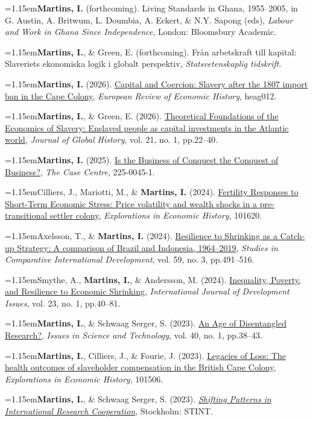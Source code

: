 \documentclass[11pt,a4paper]{article}
\newcommand{\cvlistitem}[1]{\par\addvspace{5pt}\noindent
  \textcolor{accent}{\raisebox{.45ex}{\rule{3.2pt}{3.2pt}}}\hspace{7pt}%
  \begin{minipage}[t]{\dimexpr\linewidth-12pt\relax}\hangindent=1.15em\hangafter=1\relax #1\par\end{minipage}\par}
\begin{document}
\cvlistitem{\textbf{Martins, I.} (forthcoming). Living Standards in Ghana, 1955--2005, in G. Austin, A. Britwum, L. Doumbia, A. Eckert, \& N.Y. Sapong (eds), \textit{Labour and Work in Ghana Since Independence}, London: Bloomsbury Academic.}
\smallskip
\cvlistitem{\textbf{Martins, I.}, \& Green, E. (forthcoming). Från arbetskraft till kapital: Slaveriets ekonomiska logik i globalt perspektiv, \textit{Statsvetenskaplig tidskrift}.}
\smallskip
\cvlistitem{\textbf{Martins, I.} (2026). \href{https://doi.org/10.1093/ereh/heag012}{Capital and Coercion: Slavery after the 1807 import ban in the Cape Colony}, \textit{European Review of Economic History}, heag012.}
\smallskip
\cvlistitem{\textbf{Martins, I.}, \& Green, E. (2026). \href{https://doi.org/10.1017/S1740022825100296}{Theoretical Foundations of the Economics of Slavery: Enslaved people as capital investments in the Atlantic world}, \textit{Journal of Global History}, vol. 21, no. 1, pp.22--40.}
\smallskip
\cvlistitem{\textbf{Martins, I.} (2025). \href{https://www.thecasecentre.org/products/view?id=208126}{Is the Business of Conquest the Conquest of Business?}, \textit{The Case Centre}, 225-0045-1.}
\smallskip
\cvlistitem{Cilliers, J., Mariotti, M., \& \textbf{Martins, I.} (2024). \href{https://doi.org/10.1016/j.eeh.2024.101620}{Fertility Responses to Short-Term Economic Stress: Price volatility and wealth shocks in a pre-transitional settler colony}, \textit{Explorations in Economic History}, 101620.}
\smallskip
\cvlistitem{Axelsson, T., \& \textbf{Martins, I.} (2024). \href{https://doi.org/10.1007/s12116-023-09392-1}{Resilience to Shrinking as a Catch-up Strategy: A comparison of Brazil and Indonesia, 1964--2019}, \textit{Studies in Comparative International Development}, vol. 59, no. 3, pp.491--516.}
\smallskip
\cvlistitem{Smythe, A., \textbf{Martins, I.}, \& Andersson, M. (2024). \href{https://doi.org/10.1108/IJDI-06-2023-0168}{Inequality, Poverty, and Resilience to Economic Shrinking}, \textit{International Journal of Development Issues}, vol. 23, no. 1, pp.40--81.}
\smallskip
\cvlistitem{\textbf{Martins, I.}, \& Schwaag Serger, S. (2023). \href{https://doi.org/10.58875/WBCQ3772}{An Age of Disentangled Research?}, \textit{Issues in Science and Technology}, vol. 40, no. 1, pp.38--43.}
\smallskip
\cvlistitem{\textbf{Martins, I.}, Cilliers, J., \& Fourie, J. (2023). \href{https://doi.org/10.1016/j.eeh.2022.101506}{Legacies of Loss: The health outcomes of slaveholder compensation in the British Cape Colony}, \textit{Explorations in Economic History}, 101506.}
\smallskip
\cvlistitem{\textbf{Martins, I.}, \& Schwaag Serger, S. (2023). \href{https://www.stint.se/wp-content/uploads/2023/07/STINT\_Shifting-patterns-1.pdf}{\textit{Shifting Patterns in International Research Cooperation}}, Stockholm: STINT.}
\end{document}
